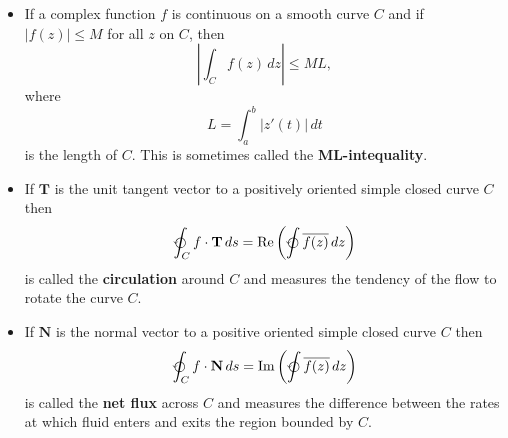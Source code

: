 \documentclass{article}
\renewcommand{\Im}{\operatorname{Im}}
\renewcommand{\Re}{\operatorname{Re}}
\renewcommand{\vec}[1]{\boldsymbol{\mathbf{#1}}}
\begin{document}
\begin{itemize}
  \item If a complex function $f$ is continuous on a smooth curve $C$ and if $|f(z)| \le M$ for all $z$ on $C$, then \[\left| \int_C f(z) \,d z \right| \le M L,\] where \[L = \int_a^b |z'(t)| \,d t\] is the length of $C$. This is sometimes called the \textbf{ML-intequality}.

  \item If $\vec{T}$ is the unit tangent vector to a positively oriented simple closed curve $C$ then \[\varointctrclockwise_C f \cdot \vec{T} \,d s = \Re \left( \varointctrclockwise \overline{f(z)} \,d z \right)\] is called the \textbf{circulation} around $C$ and measures the tendency of the flow to rotate the curve $C$.

  \item If $\vec{N}$ is the normal vector to a positive oriented simple closed curve $C$ then \[\varointctrclockwise_C f \cdot \vec{N} \,d s = \Im \left( \varointctrclockwise \overline{f(z)} \,d z \right)\] is called the \textbf{net flux} across $C$ and measures the difference between the rates at which fluid enters and exits the region bounded by $C$.
\end{itemize}
\end{document}
